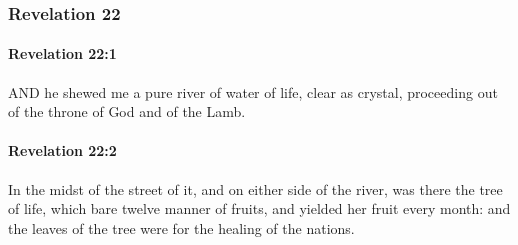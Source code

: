 	\subsubsection{Revelation 22} %
		\label{REVELATIONNT-22}
		
		\paragraph{Revelation 22:1} %
			\label{REVELATIONNT-22-1}

			AND he shewed me a pure river of water of life, clear as crystal, proceeding out of the throne of God and of the Lamb.

			\begin{framed}
			\scriptsize
				\begin{compactdesc}
					\item[SBLG] 
				\end{compactdesc}
			\end{framed}

		\paragraph{Revelation 22:2} %
			\label{REVELATIONNT-22-2}

			In the midst of the street of it, and on either side of the river, was there the tree of life, which bare twelve manner of fruits, and yielded her fruit every month: and the leaves of the tree were for the healing of the nations.

